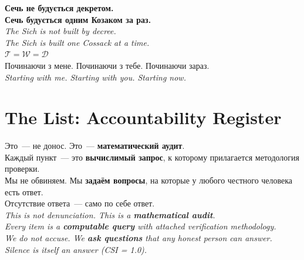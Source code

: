 \documentclass[11pt,a4paper]{article}
\theoremstyle{definition}
\theoremstyle{remark}
\newcommand{\Thought}{\mathcal{T}}
\newcommand{\Word}{\mathcal{W}}
\newcommand{\Deed}{\mathcal{D}}
\begin{document}
\vspace{0.3cm}

\begin{center}
{\large\color{sichblue}
\foreignlanguage{russian}{
\textbf{Сечь не будується декретом.}\\
\textbf{Сечь будується одним Козаком за раз.}\\[0.2cm]
}
\textit{The Sich is not built by decree.\\
The Sich is built one Cossack at a time.\\[0.2cm]}
{\color{goldcolor}$\Thought = \Word = \Deed$}\\[0.1cm]
\foreignlanguage{russian}{
Починаючи з мене. Починаючи з тебе. Починаючи зараз.
}\\
\textit{Starting with me. Starting with you.
Starting now.}
}
\end{center}

\newpage



\section{The List: Accountability Register}
\label{sec:list}

\begin{warnbox}
\foreignlanguage{russian}{
Это~--- не донос. Это~--- \textbf{математический аудит}.\\
Каждый пункт~--- это \textbf{вычислимый запрос},
к которому прилагается методология проверки.\\[0.2cm]
Мы не обвиняем. Мы \textbf{задаём вопросы},
на которые у любого честного человека есть ответ.\\
Отсутствие ответа~--- само по себе ответ.\\[0.2cm]
}
\textit{This is not denunciation. This is a \textbf{mathematical audit}.\\
Every item is a \textbf{computable query}
with attached verification methodology.\\[0.1cm]
We do not accuse. We \textbf{ask questions}
that any honest person can answer.\\
Silence is itself an answer (CSI = 1.0).}
\end{warnbox}
\end{document}
